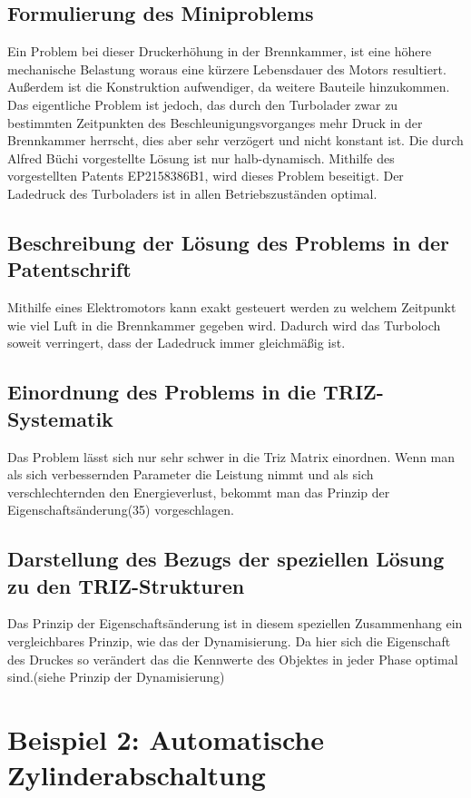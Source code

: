 \documentclass{article}
\begin{document}
\subsection{Formulierung des Miniproblems}
Ein Problem bei dieser Druckerhöhung in der Brennkammer, ist eine höhere mechanische Belastung woraus eine kürzere Lebensdauer des Motors resultiert.
Außerdem ist die Konstruktion aufwendiger, da weitere Bauteile hinzukommen.
Das eigentliche Problem ist jedoch, das durch den Turbolader zwar zu bestimmten Zeitpunkten des Beschleunigungsvorganges mehr Druck in der Brennkammer herrscht, dies aber sehr verzögert und nicht konstant ist.                                              Die durch Alfred Büchi vorgestellte Lösung ist nur halb-dynamisch. Mithilfe des vorgestellten Patents EP2158386B1, wird dieses Problem beseitigt. Der Ladedruck des Turboladers ist in allen Betriebszuständen optimal.


\subsection{Beschreibung der Lösung des Problems in der Patentschrift}

Mithilfe eines Elektromotors kann exakt gesteuert werden zu welchem Zeitpunkt wie viel Luft in die Brennkammer gegeben wird. Dadurch wird das Turboloch soweit verringert, dass der Ladedruck immer gleichmäßig ist.

\subsection{Einordnung des Problems in die TRIZ-Systematik}
Das Problem lässt sich nur sehr schwer in die Triz Matrix einordnen. Wenn man als sich verbessernden Parameter die Leistung nimmt und als sich verschlechternden den Energieverlust, bekommt man das Prinzip der Eigenschaftsänderung(35) vorgeschlagen. 
\subsection{Darstellung des Bezugs der speziellen Lösung zu den
  TRIZ-Strukturen} 
Das Prinzip der Eigenschaftsänderung ist in diesem speziellen Zusammenhang ein vergleichbares Prinzip, wie das der Dynamisierung. Da hier sich die Eigenschaft des Druckes so verändert das die Kennwerte des Objektes in jeder Phase optimal sind.(siehe Prinzip der Dynamisierung)

\section{Beispiel 2: Automatische Zylinderabschaltung}
\end{document}
